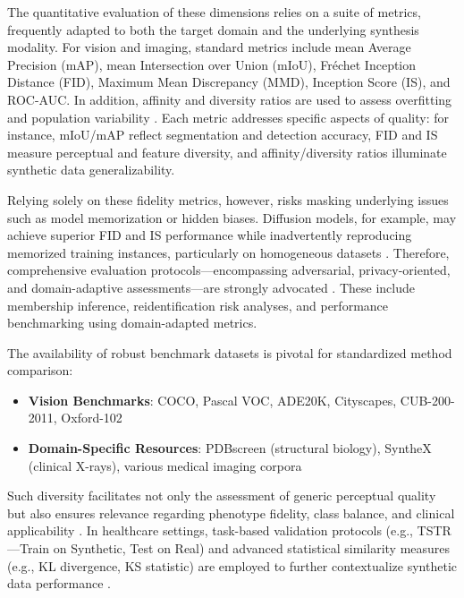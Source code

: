 The quantitative evaluation of these dimensions relies on a suite of metrics, frequently adapted to both the target domain and the underlying synthesis modality. For vision and imaging, standard metrics include mean Average Precision (mAP), mean Intersection over Union (mIoU), Fréchet Inception Distance (FID), Maximum Mean Discrepancy (MMD), Inception Score (IS), and ROC-AUC. In addition, affinity and diversity ratios are used to assess overfitting and population variability \cite{ref1}\cite{ref2}\cite{ref3}\cite{ref12}\cite{ref14}\cite{ref15}\cite{ref18}\cite{ref21}\cite{ref22}\cite{ref24}\cite{ref31}\cite{ref34}\cite{ref43}\cite{ref60}\cite{ref64}\cite{ref68}\cite{ref88}\cite{ref90}\cite{ref93}\cite{ref95}\cite{ref101}\cite{ref102}. Each metric addresses specific aspects of quality: for instance, mIoU/mAP reflect segmentation and detection accuracy, FID and IS measure perceptual and feature diversity, and affinity/diversity ratios illuminate synthetic data generalizability.

Relying solely on these fidelity metrics, however, risks masking underlying issues such as model memorization or hidden biases. Diffusion models, for example, may achieve superior FID and IS performance while inadvertently reproducing memorized training instances, particularly on homogeneous datasets \cite{ref87}\cite{ref95}. Therefore, comprehensive evaluation protocols—encompassing adversarial, privacy-oriented, and domain-adaptive assessments—are strongly advocated \cite{ref87}\cite{ref88}\cite{ref89}. These include membership inference, reidentification risk analyses, and performance benchmarking using domain-adapted metrics.

The availability of robust benchmark datasets is pivotal for standardized method comparison:

\begin{itemize}
    \item \textbf{Vision Benchmarks}: COCO, Pascal VOC, ADE20K, Cityscapes, CUB-200-2011, Oxford-102
    \item \textbf{Domain-Specific Resources}: PDBscreen (structural biology), SyntheX (clinical X-rays), various medical imaging corpora
\end{itemize}

Such diversity facilitates not only the assessment of generic perceptual quality but also ensures relevance regarding phenotype fidelity, class balance, and clinical applicability \cite{ref31}\cite{ref34}\cite{ref43}\cite{ref79}\cite{ref81}. In healthcare settings, task-based validation protocols (e.g., TSTR—Train on Synthetic, Test on Real) and advanced statistical similarity measures (e.g., KL divergence, KS statistic) are employed to further contextualize synthetic data performance \cite{ref87}\cite{ref88}\cite{ref89}.

